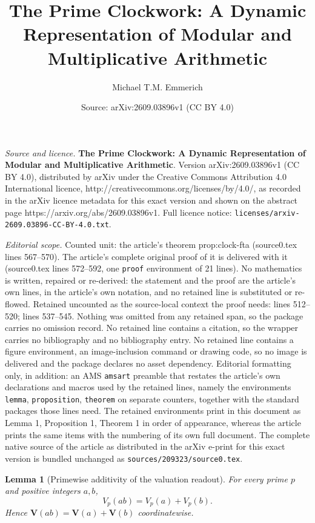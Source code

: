 \documentclass[10pt,a4paper]{amsart}
\title{\textbf{The Prime Clockwork: A Dynamic Representation of Modular and Multiplicative Arithmetic}}
\author{Michael T.M. Emmerich}
\date{Source: arXiv:2609.03896v1 (CC BY 4.0)}
\newtheorem{lemma}{Lemma}
\newcommand{\V}{\mathbf V}
\begin{document}
\maketitle

\noindent\emph{Source and licence.} \textbf{The Prime Clockwork: A Dynamic Representation of Modular and Multiplicative Arithmetic}. Version arXiv:2609.03896v1 (CC BY 4.0), distributed by arXiv under the Creative Commons Attribution 4.0 International licence, http://creativecommons.org/licenses/by/4.0/, as recorded in the arXiv licence metadata for this exact version and shown on the abstract page https://arxiv.org/abs/2609.03896v1. Full licence notice: \texttt{licenses/arxiv-2609.03896-CC-BY-4.0.txt}.\par\smallskip

\noindent\textit{Editorial scope.} Counted unit: the article's theorem prop:clock-fta (source0.tex lines 567--570). The article's complete original proof of it is delivered with it (source0.tex lines 572--592, one \texttt{proof} environment of 21 lines). No mathematics is written, repaired or re-derived: the statement and the proof are the article's own lines, in the article's own notation, and no retained line is substituted or re-flowed.  Retained uncounted as the source-local context the proof needs: lines 512--520; lines 537--545.  Nothing was omitted from any retained span, so the package carries no omission record.  No retained line contains a citation, so the wrapper carries no bibliography and no bibliography entry.  No retained line contains a figure environment, an image-inclusion command or drawing code, so no image is delivered and the package declares no asset dependency.  Editorial formatting only, in addition: an AMS \texttt{amsart} preamble that restates the article's own declarations and macros used by the retained lines, namely the environments \texttt{lemma}, \texttt{proposition}, \texttt{theorem} on separate counters, together with the standard packages those lines need.  The retained environments print in this document as Lemma 1, Proposition 1, Theorem 1 in order of appearance, whereas the article prints the same items with the numbering of its own full document.  The complete native source of the article as distributed in the arXiv e-print for this exact version is bundled unchanged as \texttt{sources/209323/source0.tex}.
\begin{lemma}[Primewise additivity of the valuation readout]
\label{lem:valuation-additive}
For every prime $p$ and positive integers $a,b$,
\begin{equation}
V_p(ab)=V_p(a)+V_p(b).
\label{eq:valuation-additive}
\end{equation}
Hence $\V(ab)=\V(a)+\V(b)$ coordinatewise.
\end{lemma}
\end{document}
